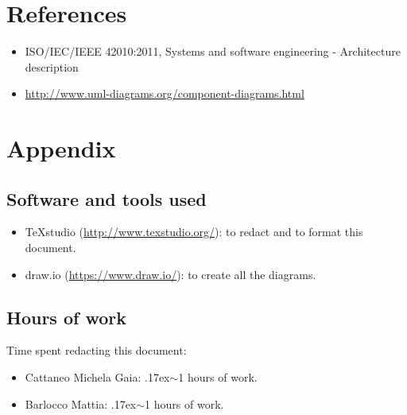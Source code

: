 \documentclass[18pt,oneside,a4paper, titlepage]{article}
\begin{document}
	\section{References}
		\begin{itemize}
			\item  ISO/IEC/IEEE 42010:2011, Systems and software engineering - Architecture description
			\item \url{http://www.uml-diagrams.org/component-diagrams.html}
		\end{itemize}
\newpage
	\section{Appendix}
		\subsection{Software and tools used}
				\begin{itemize}
					\item TeXstudio (\url{http://www.texstudio.org/}): to redact and to format this document.
					\item draw.io (\url{https://www.draw.io/}): to create all the diagrams.
				\end{itemize}
		\subsection{Hours of work}
			Time spent redacting this document:
			\begin{itemize}
				\item Cattaneo Michela Gaia: {\raise.17ex\hbox{$\scriptstyle\sim$}}1 hours of work.
				\item Barlocco Mattia: {\raise.17ex\hbox{$\scriptstyle\sim$}}1 hours of work.
			\end{itemize}
		
		
		
\end{document}
